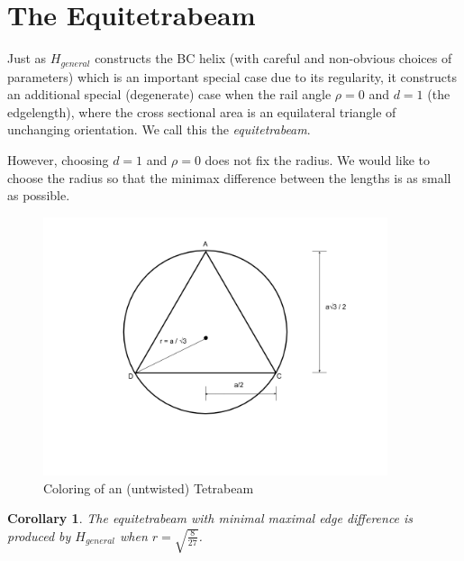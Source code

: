 \documentclass[11pt]{article}
\newtheorem{corollary}{Corollary}
\begin{document}
\section{The Equitetrabeam}

Just as $H_{general}$ constructs the BC helix (with careful and non-obvious choices of parameters)
which is an important
special case due to its regularity, it constructs an additional special
(degenerate) case when the rail angle $\rho = 0$
and $d = 1$ (the edgelength), where the cross sectional area is
an equilateral triangle of unchanging orientation.
We call this the \emph{equitetrabeam}.

However, choosing $d = 1$ and $\rho = 0$ does not fix the radius.
We would like to choose the radius so that the
minimax difference between the lengths is as small as possible.

 \begin{figure}[H]
     \centering
     \includegraphics[width=0.9\textwidth]{figures/EquilateralDiagram.png}
     \caption{Coloring of an (untwisted) Tetrabeam}
 \end{figure}


\begin{corollary}
  The equitetrabeam with minimal maximal edge difference is produced
  by $H_{general}$ when $ r = \sqrt{\frac{8}{27}} $.
  \end{corollary}
\end{document}
